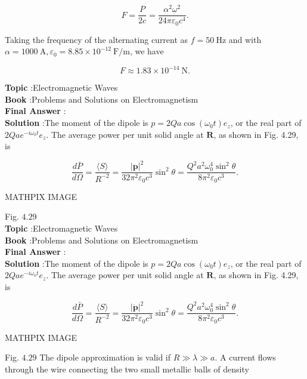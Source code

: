 \documentclass[10pt]{article}
\begin{document}
$$
F=\frac{P}{2 c}=\frac{\alpha^{2} \omega^{2}}{24 \pi \varepsilon_{0} c^{4}} .
$$

Taking the frequency of the alternating current as $f=50 \mathrm{~Hz}$ and with $\alpha=1000 \mathrm{~A}, \varepsilon_{0}=8.85 \times 10^{-12} \mathrm{~F} / \mathrm{m}$, we have

$$
F \approx 1.83 \times 10^{-14} \mathrm{~N} .
$$


\textbf{Topic} :Electromagnetic Waves\\
\textbf{Book} :Problems and Solutions on Electromagnetism\\
\textbf{Final Answer} :\\


\textbf{Solution} :The moment of the dipole is $p=2 Q a \cos \left(\omega_{0} t\right) e_{z}$, or the real part of $2 Q a e^{-i \omega_{0} t} e_{z}$. The average power per unit solid angle at $\mathbf{R}$, as shown in Fig. 4.29, is

$$
\frac{d \bar{P}}{d \Omega}=\frac{\langle S\rangle}{R^{-2}}=\frac{|\ddot{\mathbf{p}}|^{2}}{32 \pi^{2} \varepsilon_{0} c^{3}} \sin ^{2} \theta=\frac{Q^{2} a^{2} \omega_{0}^{4} \sin ^{2} \theta}{8 \pi^{2} \varepsilon_{0} c^{3}} .
$$



MATHPIX IMAGE

Fig. $4.29$
\\
\textbf{Topic} :Electromagnetic Waves\\
\textbf{Book} :Problems and Solutions on Electromagnetism\\
\textbf{Final Answer} :\\


\textbf{Solution} :The moment of the dipole is $p=2 Q a \cos \left(\omega_{0} t\right) e_{z}$, or the real part of $2 Q a e^{-i \omega_{0} t} e_{z}$. The average power per unit solid angle at $\mathbf{R}$, as shown in Fig. 4.29, is

$$
\frac{d \bar{P}}{d \Omega}=\frac{\langle S\rangle}{R^{-2}}=\frac{|\ddot{\mathbf{p}}|^{2}}{32 \pi^{2} \varepsilon_{0} c^{3}} \sin ^{2} \theta=\frac{Q^{2} a^{2} \omega_{0}^{4} \sin ^{2} \theta}{8 \pi^{2} \varepsilon_{0} c^{3}} .
$$



MATHPIX IMAGE

Fig. $4.29$
 The dipole approximation is valid if $R \gg \lambda \gg a$.
 A current flows through the wire connecting the two small metallic balls of density
\end{document}
